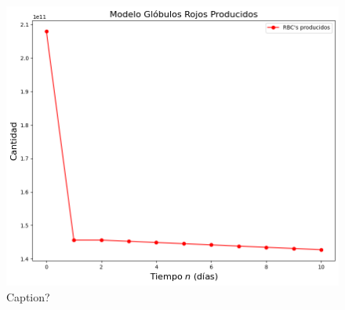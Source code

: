 \begin{figure}[h]
    \centering
    \includegraphics[scale=0.55]{figures/BaseG07SC.png}
    \caption{Caption?}
    \label{sec:modelo:fig:G07SC}
\end{figure}

\FloatBarrier

